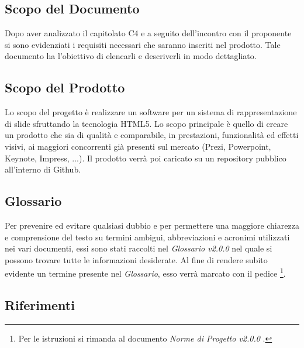 \subsection{Scopo del Documento}
Dopo aver analizzato il capitolato C4 e a seguito dell'incontro con il proponente si sono evidenziati i requisiti
necessari che saranno inseriti nel prodotto. Tale documento ha l'obiettivo di elencarli e descriverli in modo dettagliato.

\subsection{Scopo del Prodotto}
Lo scopo del progetto è realizzare un software per un sistema di rappresentazione di \gls{slide} sfruttando la tecnologia \gls{HTML5}.
Lo scopo principale è quello di creare un prodotto che sia di qualità e comparabile, in prestazioni, funzionalità ed 
effetti visivi, ai maggiori concorrenti già presenti sul mercato (Prezi, Powerpoint, Keynote, Impress, ...).
Il prodotto verrà poi caricato su un repository pubblico all'interno di Github.

\subsection{Glossario}
Per prevenire ed evitare qualsiasi dubbio e per permettere una maggiore chiarezza e comprensione del testo su termini ambigui, abbreviazioni e acronimi utilizzati nei vari documenti, essi sono stati raccolti nel \textit{Glossario v2.0.0} nel quale si possono trovare tutte le informazioni desiderate.
Al fine di rendere subito evidente un termine presente nel \textit{Glossario}, esso verrà marcato con il pedice \G\footnote{Per le istruzioni si rimanda al documento \textit{Norme di Progetto v2.0.0} .}.

\subsection{Riferimenti}
